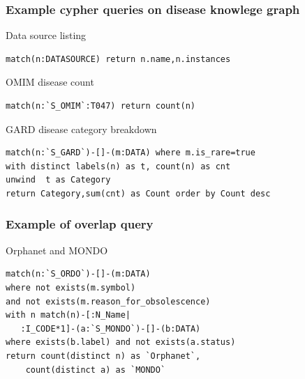 ﻿\documentclass[anchorcolor=blue,linkcolor=blue]{beamer}
\begin{document}
\begin{frame}[fragile]
  \frametitle{Example cypher queries on disease knowlege graph}
  \begin{block}{Data source listing}
    \small
\begin{verbatim}
match(n:DATASOURCE) return n.name,n.instances
\end{verbatim}
  \end{block}

  \begin{block}{OMIM disease count}
    \small
\begin{verbatim}
match(n:`S_OMIM`:T047) return count(n)
\end{verbatim}
  \end{block}
  
  \begin{block}{GARD disease category breakdown}
    \small
\begin{verbatim}
match(n:`S_GARD`)-[]-(m:DATA) where m.is_rare=true 
with distinct labels(n) as t, count(n) as cnt 
unwind  t as Category
return Category,sum(cnt) as Count order by Count desc
\end{verbatim}
  \end{block}
\end{frame}

\begin{frame}[fragile]
  \frametitle{Example of overlap query}
  \begin{block}{Orphanet and MONDO}
    \small
\begin{verbatim}
match(n:`S_ORDO`)-[]-(m:DATA) 
where not exists(m.symbol) 
and not exists(m.reason_for_obsolescence) 
with n match(n)-[:N_Name|
   :I_CODE*1]-(a:`S_MONDO`)-[]-(b:DATA) 
where exists(b.label) and not exists(a.status) 
return count(distinct n) as `Orphanet`,
    count(distinct a) as `MONDO`
\end{verbatim}
  \end{block}
\end{frame}
\end{document}
